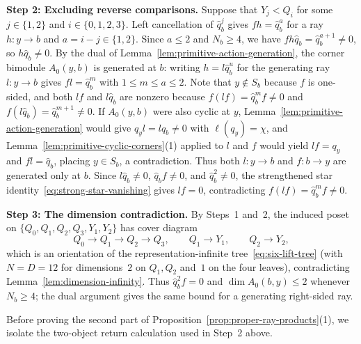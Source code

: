 \medskip
\noindent\textbf{Step 2: Excluding reverse comparisons.}
Suppose that $Y_j<Q_i$ for some $j\in\{1,2\}$ and $i\in\{0,1,2,3\}$. Left cancellation of $\widehat q_b^j$ gives $fh=\widehat q_b^a$ for a ray $h\colon y\to b$ and $a=i-j\in\{1,2\}$. Since $a\leq2$ and $N_b\geq4$, we have $fh\widehat q_b=\widehat q_b^{a+1}\ne0$, so $h\widehat q_b\ne0$. By the dual of Lemma~\ref{lem:primitive-action-generation}, the corner bimodule $A_0(y,b)$ is generated at $b$: writing $h=l\widehat q_b^u$ for the generating ray $l\colon y\to b$ gives $fl=\widehat q_b^m$ with $1\leq m\leq a\leq2$. Note that $y\notin S_b$ because $f$ is one-sided, and both $lf$ and $l\widehat q_b$ are nonzero because $f(lf)=\widehat q_b^mf\ne0$ and $f(l\widehat q_b)=\widehat q_b^{m+1}\ne0$. If $A_0(y,b)$ were also cyclic at $y$, Lemma~\ref{lem:primitive-action-generation} would give $q_yl=l\widehat q_b\ne0$ with $\ell(q_y)=\chi$, and Lemma~\ref{lem:primitive-cyclic-corners}(1) applied to $l$ and $f$ would yield $lf=q_y$ and $fl=\widehat q_b$, placing $y\in S_b$, a contradiction. Thus both $l\colon y\to b$ and $f\colon b\to y$ are generated only at $b$. Since $l\widehat q_b\ne0$, $\widehat q_bf\ne0$, and $\widehat q_b^2\ne0$, the strengthened star identity~\eqref{eq:strong-star-vanishing} gives $lf=0$, contradicting $f(lf)=\widehat q_b^mf\ne0$.

\medskip
\noindent\textbf{Step 3: The dimension contradiction.}
By Steps~1 and~2, the induced poset on $\{Q_0,Q_1,Q_2,Q_3,Y_1,Y_2\}$ has cover diagram
\[
  Q_0\longrightarrow Q_1\longrightarrow Q_2\longrightarrow Q_3,\qquad
  Q_1\longrightarrow Y_1,\qquad Q_2\longrightarrow Y_2,
\]
which is an orientation of the representation-infinite tree~\eqref{eq:six-lift-tree} (with $N=D=12$ for dimensions~$2$ on $Q_1,Q_2$ and~$1$ on the four leaves), contradicting Lemma~\ref{lem:dimension-infinity}. Thus $\widehat q_b^2f=0$ and $\dim A_0(b,y)\leq2$ whenever $N_b\geq4$; the dual argument gives the same bound for a generating right-sided ray.

\medskip
Before proving the second part of Proposition~\ref{prop:proper-ray-products}(1), we isolate the two-object return calculation used in Step~2 above.

